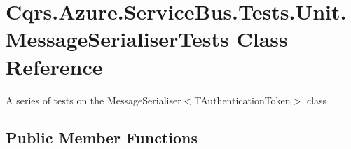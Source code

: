 \hypertarget{classCqrs_1_1Azure_1_1ServiceBus_1_1Tests_1_1Unit_1_1MessageSerialiserTests}{}\section{Cqrs.\+Azure.\+Service\+Bus.\+Tests.\+Unit.\+Message\+Serialiser\+Tests Class Reference}
\label{classCqrs_1_1Azure_1_1ServiceBus_1_1Tests_1_1Unit_1_1MessageSerialiserTests}


A series of tests on the Message\+Serialiser$<$\+T\+Authentication\+Token$>$ class  


\subsection*{Public Member Functions}
